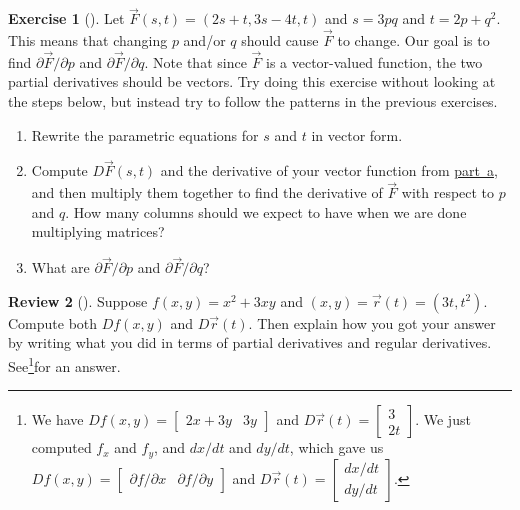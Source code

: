 \documentclass[10pt,]{book}
\theoremstyle{plain}
\theoremstyle{definition}
\theoremstyle{definition}
\theoremstyle{definition}
\newtheorem{project}{Review}[section]
\theoremstyle{definition}
\newtheorem{exploration}[project]{Exercise}
\theoremstyle{definition}
\numberwithin{equation}{section}
\newcommand{\amp}{&}
\begin{document}
\begin{exploration}[]\label{exploration-154}
Let \(\vec F(s,t) = (2s+t,3s-4t,t)\) and \(s=3pq\) and \(t=2p+q^2\). This means that changing \(p\) and/or \(q\) should cause \(\vec F\) to change. Our goal is to find \(\partial \vec F/\partial p\) and \(\partial \vec F/\partial q\). Note that since \(\vec F\) is a vector-valued function, the two partial derivatives should be vectors. Try doing this exercise without looking at the steps below, but instead try to follow the patterns in the previous exercises.%
\begin{enumerate}[font=\bfseries,label=(\alph*),ref=\alph*]
\item\label{item_3} Rewrite the parametric equations for \(s\) and \(t\) in vector form.%
\item\label{task-365} Compute \(D\vec F(s,t)\) and the derivative of your vector function from \hyperref[item_3]{part~a}, and then multiply them together to find the derivative of \(\vec F\) with respect to \(p\) and \(q\).  How many columns should we expect to have when we are done multiplying matrices?%
\item\label{task-366} What are \(\partial \vec F/\partial p\) and \(\partial \vec F/\partial q\)?%
\end{enumerate}
\end{exploration}
\begin{project}[]\label{project-5}
Suppose \(f(x,y)=x^2+3xy\) and \((x,y) = \vec r(t) = (3t,t^2)\). Compute both \(Df(x,y)\) and \(D\vec r(t)\). Then explain how you got your answer by writing what you did in terms of partial derivatives and regular derivatives. See\footnote{We have \(Df(x,y) = \begin{bmatrix}2x+3y\amp 3y
\end{bmatrix}\) and \(D\vec r(t) = \begin{bmatrix}3\\2t
\end{bmatrix}\). We just computed \(f_x\) and \(f_y\), and \(dx/dt\) and \(dy/dt\), which gave us \(Df(x,y) = \begin{bmatrix}\partial f/\partial x\amp \partial f/\partial y
\end{bmatrix}\) and \(D\vec r(t) = \begin{bmatrix}dx/dt\\dy/dt
\end{bmatrix}\).\label{fn-4}}for an answer.%
\end{project}
\typeout{************************************************}
\typeout{************************************************}
\end{document}
